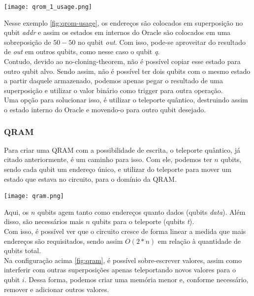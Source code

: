 \documentclass{article}
\begin{document}
\begin{center}
	\texttt{[image: qrom\_1\_usage.png]}
	\label{fig:qrom-usage}
\end{center}

Nesse exemplo \ref{fig:qrom-usage}, os endereços são colocados em superposição no qubit \emph{addr} e assim os estados em internos do Oracle são colocados em uma sobreposição de $50-50$ no qubit \emph{out}. Com isso, pode-se aproveitar do resultado de \emph{out} em outros qubits, como nesse caso o qubit \emph{q}.\\
Contudo, devido ao no-cloning-theorem, não é possível copiar esse estado para outro qubit alvo. Sendo assim, não é possível ter dois qubits com o mesmo estado a partir daquele armazenado, podemos apenas pegar o resultado de uma superposição e utilizar o valor binário como trigger para outra operação.\\
Uma opção para solucionar isso, é utilizar o teleporte quântico, destruindo assim o estado interno do Oracle e movendo-o para outro qubit desejado.

\subsubsection{QRAM}
Para criar uma QRAM com a possibilidade de escrita, o teleporte quântico, já citado anteriormente, é um caminho para isso. Com ele, podemos ter $n$ qubits, sendo cada qubit um endereço único, e utilizar do teleporte para mover um estado que estava no circuito, para o domínio da QRAM.

 \begin{center}
 	\texttt{[image: qram.png]}
 	\label{fig:qram}
 \end{center}

Aqui, os $n$ qubits agem tanto como endereços quanto dados (qubits \emph{data}). Além disso, são necessários mais $n$ qubits para o teleporte (qubits \emph{t}).\\
Com isso, é possível ver que o circuito cresce de forma linear a medida que mais endereços são requisitados, sendo assim $O(2*n)$ em relação à quantidade de qubits total.\\
Na configuração acima \ref{fig:qram}, é possível sobre-escrever valores, assim como interferir com outras superposições apenas teleportando novos valores para o qubit $i$. Dessa forma, podemos criar uma memória menor e, conforme necessário, remover e adicionar outros valores.
\end{document}
